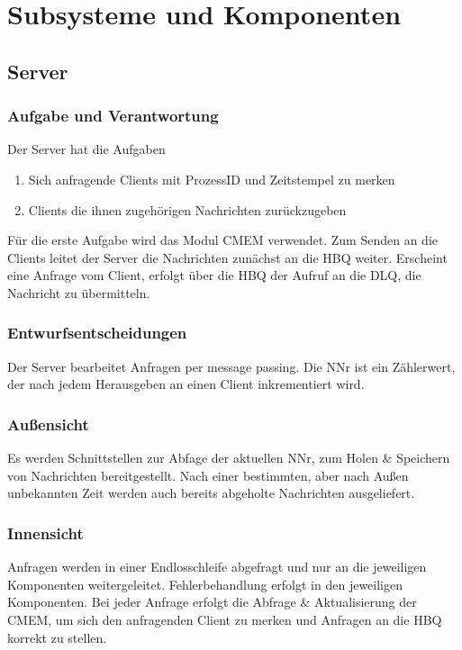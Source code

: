 \documentclass{article}
\begin{document}
\newpage
\section{Subsysteme und Komponenten}

\subsection{Server}
\subsubsection{Aufgabe und Verantwortung}
Der Server hat die Aufgaben  
\begin{enumerate}
	\item{Sich anfragende Clients mit ProzessID und Zeitstempel zu merken}
    \item{Clients die ihnen zugehörigen Nachrichten zurückzugeben}
\end{enumerate}
Für die erste Aufgabe wird das Modul CMEM verwendet. 
Zum Senden an die Clients leitet der Server die Nachrichten zunächst an die HBQ weiter. 
Erscheint eine Anfrage vom Client, erfolgt über die HBQ der Aufruf an die DLQ, die Nachricht zu übermitteln.

\subsubsection{Entwurfsentscheidungen}
Der Server bearbeitet Anfragen per message passing. Die NNr ist ein Zählerwert, der nach jedem Herausgeben an einen Client inkrementiert wird.

\subsubsection{Außensicht}
Es werden Schnittstellen zur Abfage der aktuellen NNr, zum Holen \& Speichern von Nachrichten bereitgestellt. Nach einer bestimmten, aber nach Außen unbekannten Zeit werden auch bereits abgeholte Nachrichten ausgeliefert.

\subsubsection{Innensicht}
Anfragen werden in einer Endlosschleife abgefragt und nur an die jeweiligen Komponenten weitergeleitet. Fehlerbehandlung erfolgt in den jeweiligen Komponenten. Bei jeder Anfrage erfolgt die Abfrage \& Aktualisierung der CMEM, um sich den anfragenden Client zu merken und Anfragen an die HBQ korrekt zu stellen.
			
\end{document}
